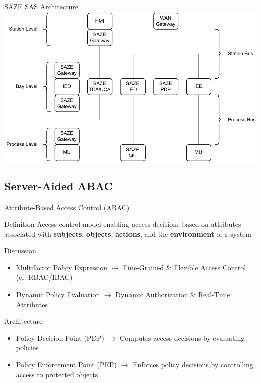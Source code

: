 \documentclass[en]{sdqbeamer}
\begin{document}
\begin{frame}{SAZE SAS Architecture}
    \centering
    \includegraphics[height=0.75\textheight]{./figures/saze_architecture.drawio.pdf}
\end{frame}

\subsection{Server-Aided ABAC}
\begin{frame}{Attribute-Based Access Control (ABAC)}
    \begin{greenblock}{Definition \parencite{JTF2020}}
        Access control model enabling access decisions based on attributes associated with \textbf{subjects}, \textbf{objects}, \textbf{actions}, and the \textbf{environment} of a system
    \end{greenblock}

    \begin{blueblock}{Discussion \parencite{Hu2014}}
        \begin{itemize}
            \item Multifactor Policy Expression $\rightarrow$ Fine-Grained \& Flexible Access Control (cf. RBAC/IBAC)
            \item Dynamic Policy Evaluation $\rightarrow$ Dynamic Authorization \& Real-Time Attributes
        \end{itemize}
    \end{blueblock}

    \begin{grayblock}{Architecture \parencite{Hu2014,Oasis2013}}
        \begin{itemize}
            \item Policy Decision Point (PDP) $\rightarrow$ Computes access decisions by evaluating policies
            \item Policy Enforcement Point (PEP) $\rightarrow$ Enforces policy decisions by controlling access to protected objects
        \end{itemize}
    \end{grayblock}
\end{frame}
\end{document}
